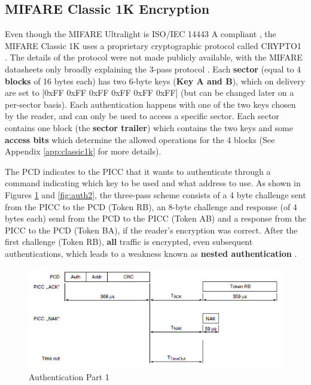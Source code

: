 \documentclass[fleqn,10pt]{SelfArx} %
\begin{document}
\subsection{MIFARE Classic 1K Encryption}
\label{subsec:crypto1}

Even though the MIFARE Ultralight is ISO/IEC 14443 A compliant \cite{ultralight}, the MIFARE Classic 1K uses a proprietary cryptographic protocol called CRYPTO1 \cite{classic1k}. The details of the protocol were not made publicly available, with the MIFARE datasheets only broadly explaining the 3-pass protocol \cite{classic1k}. Each {\bf sector} (equal to 4 {\bf blocks} of 16 bytes each) has two 6-byte keys ({\bf Key A and B}), which on delivery are set to [0xFF 0xFF 0xFF 0xFF 0xFF 0xFF] (but can be changed later on a per-sector basis). Each authentication happens with one of the two keys chosen by the reader, and can only be used to access a specific sector. Each sector contains one block (the {\bf sector trailer}) which contains the two keys and some {\bf access bits} which determine the allowed operations for the 4 blocks (See Appendix \ref{app:classic1k} for more details).


The PCD indicates to the PICC that it wants to authenticate through a command indicating which key to be used and what address to use. As shown in Figures \ref{fig:auth1} and \ref{fig:auth2}, the three-pass scheme consists of a 4 byte challenge sent from the PICC to the PCD  (Token RB), an 8-byte challenge and response (of 4 bytes each) send from the PCD to the PICC (Token AB) and a response from the PICC to the PCD (Token BA), if the reader's encryption was correct. After the first challenge (Token RB), {\bf all} traffic is encrypted, even subsequent authentications, which leads to a weakness known as {\bf nested authentication} \cite{classicvulnerabilities}.

\begin{figure}[h]
  \includegraphics[width=\linewidth]{img/auth1}
  \caption{Authentication Part 1 \cite{classic1k}}
  \label{fig:auth1}
\end{figure}
\end{document}
